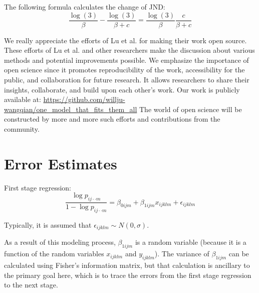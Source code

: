 The following formula calculates the change of JND:
\begin{equation}
    \frac{\log(3)}{\beta} - \frac{\log(3)}{\beta + c} = \frac{\log(3)}{\beta} \frac{c}{\beta + c}
\end{equation}

We really appreciate the efforts of Lu et al. \cite{JNDVIS21} for making their work open source. These efforts of Lu et al. and other researchers make the discussion about various methods and potential improvements possible. We emphasize the importance of open science since it promotes reproducibility of the work, accessibility for the public, and collaboration for future research. It allows researchers to share their insights, collaborate, and build upon each other's work.
Our work is publicly available at: \url{https://github.com/willju-wangqian/one_model_that_fits_them_all}
The world of open science will be constructed by more and more such efforts and contributions from the community.


\appendices




\section{Error Estimates}

First stage regression: $$\frac{\log{p_{ij\cdot\cdot m}}}{1-\log{p_{ij\cdot\cdot m}}} = \beta_{0ijm} + \beta_{1ijm} x_{ijklm} + \epsilon_{ijklm}$$

Typically, it is assumed that $\epsilon_{ijklm} \sim N(0, \sigma)$.

As a result of this modeling process, $\beta_{1ijm}$ is a random variable (because it is a function of the random variables $x_{ijklm}$ and $y_{ijklm}$). The variance of $\beta_{1ijm}$ can be calculated using Fisher's information matrix, but that calculation is ancillary to the primary goal here, which is to trace the errors from the first stage regression to the next stage. 

